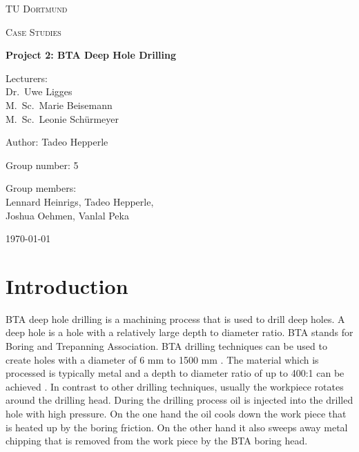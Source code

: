 \documentclass[12 pt]{scrartcl}
\begin{document}
\begin{titlepage}
  \centering
  {\scshape\LARGE TU Dortmund \par}
  \vspace{1cm}
  {\scshape\Large Case Studies \par}
  \vspace{2cm}
  {\huge\bfseries Project 2: BTA Deep Hole Drilling\par}
  \vspace{2cm}
  {\Large Lecturers:\\
    Dr.\ Uwe Ligges \\
    M.\ Sc.\ Marie Beisemann\\
    M.\ Sc.\ Leonie Schürmeyer \par}
  \vspace{1cm}
  {\Large Author: Tadeo Hepperle \par}
  \vspace{0.5 cm}
  {\Large Group number: 5\par}
  \vspace{0.5 cm}
  {\Large Group members: \\
    Lennard Heinrigs, Tadeo Hepperle, \\
    Joshua Oehmen, Vanlal Peka}
  \vfill
  {\large \today\par}
\end{titlepage}

\tableofcontents

\cleardoublepage

\section{Introduction}

BTA deep hole drilling is a machining process that is used to drill deep holes. A deep hole is a hole with a relatively large depth to diameter ratio.
BTA stands for Boring and Trepanning Association. BTA drilling techniques can be used to create holes with a diameter of 6 mm to 1500 mm \citep[p.~4]{Tiefbohrverfahren}. The material which is processed is typically metal and a depth to diameter ratio of up to 400:1 can be achieved \citep{UNISIGBTA}. In contrast to other drilling techniques, usually the workpiece rotates around the drilling head. During the drilling process oil is injected into the drilled hole with high pressure. On the one hand the oil cools down the work piece that is heated up by the boring friction. On the other hand it also sweeps away metal chipping that is removed from the work piece by the BTA boring head.
\end{document}
